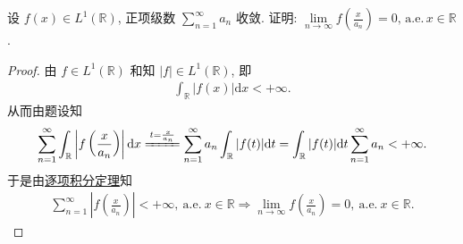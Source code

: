 \documentclass[../../main.tex]{subfiles}%
\begin{document}
\begin{example}
设 $f(x) \in L^1(\mathbb{R})$, 正项级数 $\sum\limits_{n=1}^\infty a_n$ 收敛. 证明: $\lim\limits_{n \to \infty} f\left(\frac{x}{a_n}\right) = 0,\,\text{a.e.}\,x \in \mathbb{R}$.
\end{example}
\begin{proof}
由 $f\in L^1(\mathbb{R})$ 和知 $|f|\in L^1(\mathbb{R})$, 即
\begin{align*}
\int_{\mathbb{R}} |f(x)| \mathrm{d}x < +\infty.
\end{align*}
从而由题设知
\begin{align*}
\sum_{n=1}^{\infty} \int_{\mathbb{R}} \left| f\left( \frac{x}{a_n} \right) \right| \mathrm{d}x \xlongequal{t=\frac{x}{a_n}} \sum_{n=1}^{\infty} a_n \int_{\mathbb{R}} |f(t)| \mathrm{d}t = \int_{\mathbb{R}} |f(t)| \mathrm{d}t \sum_{n=1}^{\infty} a_n < +\infty.
\end{align*}
于是由\hyperref[corollary:逐项积分定理]{逐项积分定理}知
\begin{align*}
\sum_{n=1}^{\infty} \left| f\left( \frac{x}{a_n} \right) \right| < +\infty,\ \mathrm{a.e.}\ x\in \mathbb{R} \Longrightarrow \lim\limits_{n\rightarrow \infty} f\left( \frac{x}{a_n} \right) =0,\ \mathrm{a.e.}\ x\in \mathbb{R}.
\end{align*}
\end{proof}
\end{document}
